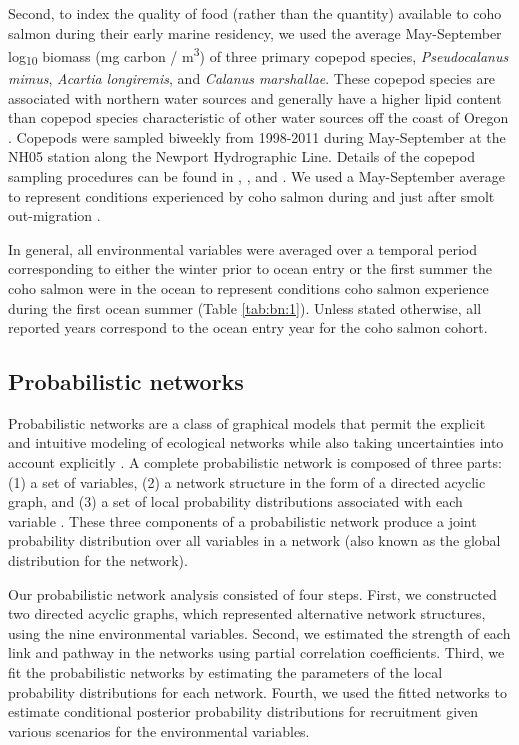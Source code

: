 Second, to index the quality of food (rather than the quantity) available to
coho salmon during their early marine residency, we used the average
May-September log\textsubscript{10} biomass (mg carbon / m\textsuperscript{3})
of three primary copepod species, \emph{Pseudocalanus mimus}, \emph{Acartia
longiremis}, and \emph{Calanus marshallae}. These copepod species are associated
with northern water sources and generally have a higher lipid content than
copepod species characteristic of other water sources off the coast of Oregon
\citep{Lee2006, Hooff2006a}. Copepods were sampled biweekly from 1998-2011
during May-September at the NH05 station along the Newport Hydrographic Line.
Details of the copepod sampling procedures can be found in \citet{Lamb2005a},
\citet{Peterson2003a}, and \citet{Bi2011b}.  We used a May-September average to
represent conditions experienced by coho salmon during and just after smolt
out-migration \citep{Bi2011a}.

In general, all environmental variables were averaged over a temporal period
corresponding to either the winter prior to ocean entry or the first summer the
coho salmon were in the ocean to represent conditions coho salmon experience
during the first ocean summer (Table \ref{tab:bn:1}). Unless stated otherwise,
all reported years correspond to the ocean entry year for the coho salmon
cohort.


\subsection{Probabilistic networks}

Probabilistic networks are a class of graphical models that permit the explicit
and intuitive modeling of ecological networks while also taking uncertainties
into account explicitly \citep{Pearl1988a, Varis1995a}. A complete probabilistic
network is composed of three parts: (1) a set of variables, (2) a network
structure in the form of a directed acyclic graph, and (3) a set of local
probability distributions associated with each variable \citep{Heckerman1996a}.
These three components of a probabilistic network produce a joint probability
distribution over all variables in a network (also known as the global
distribution for the network).

Our probabilistic network analysis consisted of four steps. First, we
constructed two directed acyclic graphs, which represented alternative network
structures, using the nine environmental variables. Second, we estimated the
strength of each link and pathway in the networks using partial correlation
coefficients. Third, we fit the probabilistic networks by estimating the
parameters of the local probability distributions for each network. Fourth, we
used the fitted networks to estimate conditional posterior probability
distributions for recruitment given various scenarios for the environmental
variables.


